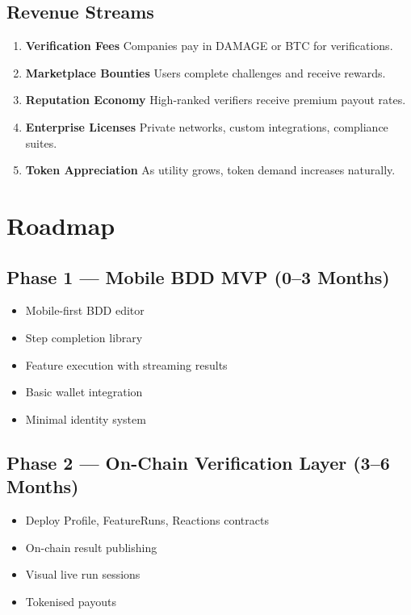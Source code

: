 \documentclass[12pt,a4paper]{article}
\begin{document}
\subsection{Revenue Streams}

\begin{enumerate}
    \item \textbf{Verification Fees}  
          Companies pay in DAMAGE or BTC for verifications.
    \item \textbf{Marketplace Bounties}  
          Users complete challenges and receive rewards.
    \item \textbf{Reputation Economy}  
          High-ranked verifiers receive premium payout rates.
    \item \textbf{Enterprise Licenses}  
          Private networks, custom integrations, compliance suites.
    \item \textbf{Token Appreciation}  
          As utility grows, token demand increases naturally.
\end{enumerate}

\section{Roadmap}

\subsection{Phase 1 — Mobile BDD MVP (0–3 Months)}

\begin{itemize}
    \item Mobile-first BDD editor
    \item Step completion library
    \item Feature execution with streaming results
    \item Basic wallet integration
    \item Minimal identity system
\end{itemize}

\subsection{Phase 2 — On-Chain Verification Layer (3–6 Months)}

\begin{itemize}
    \item Deploy Profile, FeatureRuns, Reactions contracts
    \item On-chain result publishing
    \item Visual live run sessions
    \item Tokenised payouts
\end{itemize}
\end{document}
